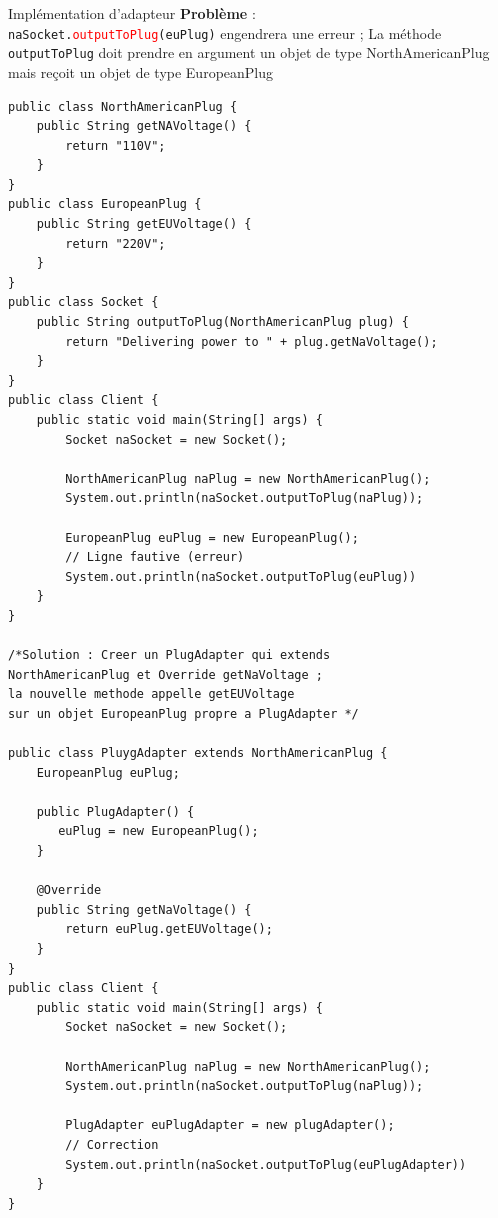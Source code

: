 \documentclass[16pt]{report}
\begin{document}
\begin{multicols*}{2}
        \begin{EExample}{Implémentation d'adapteur}{}
            \textbf{Problème} :
            \vspace{1em}\\
            \texttt{naSocket.\textcolor{red}{outputToPlug}(euPlug)} engendrera une erreur ; 
            La méthode \texttt{outputToPlug} doit prendre en argument un objet de type 
            \textcolor{myb}{NorthAmericanPlug} mais reçoit un objet de type \textcolor{myb}{EuropeanPlug}

\begin{lstlisting}[style=JavaDraculaWhite] 
public class NorthAmericanPlug {
    public String getNAVoltage() {
        return "110V";
    }
}
public class EuropeanPlug {
    public String getEUVoltage() { 
        return "220V";
    }
}
public class Socket {
    public String outputToPlug(NorthAmericanPlug plug) {
        return "Delivering power to " + plug.getNaVoltage();
    }
}
public class Client {
    public static void main(String[] args) {
        Socket naSocket = new Socket(); 

        NorthAmericanPlug naPlug = new NorthAmericanPlug(); 
        System.out.println(naSocket.outputToPlug(naPlug));

        EuropeanPlug euPlug = new EuropeanPlug(); 
        // Ligne fautive (erreur)
        System.out.println(naSocket.outputToPlug(euPlug))
    }
}

/*Solution : Creer un PlugAdapter qui extends 
NorthAmericanPlug et Override getNaVoltage ; 
la nouvelle methode appelle getEUVoltage 
sur un objet EuropeanPlug propre a PlugAdapter */  

public class PluygAdapter extends NorthAmericanPlug {
    EuropeanPlug euPlug; 

    public PlugAdapter() {
       euPlug = new EuropeanPlug(); 
    }

    @Override
    public String getNaVoltage() {
        return euPlug.getEUVoltage();
    }
}
public class Client {
    public static void main(String[] args) {
        Socket naSocket = new Socket(); 

        NorthAmericanPlug naPlug = new NorthAmericanPlug(); 
        System.out.println(naSocket.outputToPlug(naPlug));

        PlugAdapter euPlugAdapter = new plugAdapter(); 
        // Correction
        System.out.println(naSocket.outputToPlug(euPlugAdapter))
    }
}


\end{lstlisting}


\end{EExample}
\end{multicols*}
\end{document}
